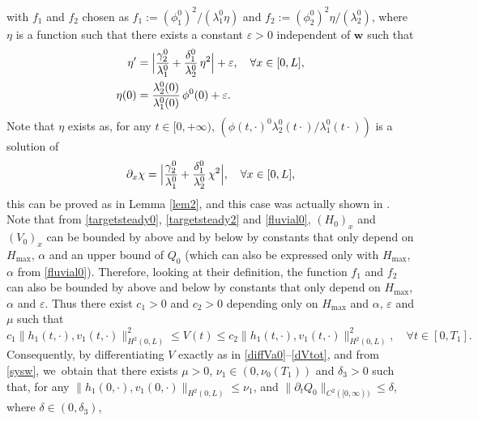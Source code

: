 \documentclass[JEP,XML,SOM,Unicode]{cedram}
\theoremstyle{definition}
\begin{document}
with $f_{1}$ and $f_{2}$ chosen as $f_{1}:=(\phi_{1}^{0})^{2}/(\lambda_{1}^{0}\eta)$ and $f_{2}:=(\phi_{2}^{0})^{2}\eta/(\lambda_{2}^{0})$,
where $\eta$ is a function such that there exists a constant $\varepsilon>0$ independent of $\boldsymbol{w}$ such that
\begin{equation*}
\begin{split}
\eta'&=\Bigl|\frac{\gamma_{2}^{0}}{\lambda_{1}^{0}}+\frac{\delta_{1}^{0}}{\lambda_{2}^{0}}\,\eta^{2}\Bigr|+\varepsilon,\quad \forall x\in[0,L],\\
\eta(0)&=\frac{\lambda_{2}^{0}(0)}{\lambda_{1}^{0}(0)}\,\phi^{0}(0)+\varepsilon.
\end{split}
\end{equation*}
Note that $\eta$ exists as, for any $t\in[0,+\infty)$, $(\phi(t,\cdot)^{0}\lambda_{2}^{0}(t\cdot)/\lambda_{1}^{0}(t\cdot))$ is a solution of
\begin{equation*}
\partial_{x} \chi=\Bigl|\frac{\gamma_{2}^{0}}{\lambda_{1}^{0}}+\frac{\delta_{1}^{0}}{\lambda_{2}^{0}}\,\chi^{2}\Bigr|, \quad\forall x\in[0,L],
\end{equation*}
this can be proved as in Lemma \ref{lem2}, and this case was actually shown in \cite{HS}.
Note that from \eqref{targetsteady0}, \eqref{targetsteady2} and \eqref{fluvial0}, $(H_{0})_{x}$ and $(V_{0})_{x}$ can be bounded by above and by below by constants that only depend on $H_{\max}$, $\alpha$ and an upper bound of $Q_{0}$ (which can also be expressed only with $H_{\max}$, $\alpha$ from \eqref{fluvial0}). Therefore, looking at their definition, the function $f_{1}$ and $f_{2}$ can also be bounded by above and below by constants that only depend on $H_{\max}$, $\alpha$ and $\varepsilon$. Thus there exist $c_{1}>0$ and $c_{2}>0$ depending only on $H_{\max}$ and $\alpha$, $\varepsilon$ and $\mu$ such that
\begin{equation}
c_{1}\lVert h_{1}(t,\cdot),v_{1}(t,\cdot)\rVert_{H^{2}(0,L)}^{2}\leq V(t)\leq c_{2}\lVert h_{1}(t,\cdot),v_{1}(t,\cdot)\rVert_{H^{2}(0,L)}^{2},\quad\forall t\in[0,T_{1}].
\label{equiv2}
\end{equation}
Consequently, by differentiating $V$ exactly as in \eqref{diffVa0}--\eqref{dVtot}, and from \eqref{sysw}, we~obtain that there exists $\mu>0$, $\nu_{1}\in(0,\nu_{0}(T_{1}))$ and ${\delta_{3}}>0$ such that, for any $\lVert h_{1}(0,\cdot),v_{1}(0,\cdot)\rVert_{H^{2}(0,L)}\leq \nu_{1}$,
and $\lVert\partial_{t}Q_{0}\rVert_{C^{2}([0,\infty))}\leq \delta$, where $\delta\in(0,\delta_{3})$,
\end{document}
